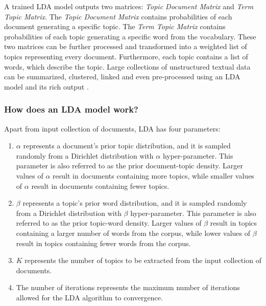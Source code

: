             A trained LDA model outputs two matrices: \emph{Topic Document Matrix} and \emph{Term Topic Matrix}. The \emph{Topic Document Matrix} contains probabilities of each document generating a specific topic. The \emph{Term Topic Matrix} contains probabilities of each topic generating a specific word from the vocabulary. These two matrices can be further processed and transformed into a weighted list of topics representing every document. Furthermore, each topic contains a list of words, which describe the topic. Large collections of unstructured textual data can be summarized, clustered, linked and even pre-processed using an LDA model and its rich output \cite{campbell2015latent}.
        
        \subsubsection{How does an LDA model work?}
        
            Apart from input collection of documents, LDA has four parameters:
            
            \begin{enumerate}
                \item $\alpha$ represents a document's prior topic distribution, and it is sampled randomly from a Dirichlet distribution with $\alpha$ hyper-parameter. This parameter is also referred to as the prior document-topic density. Larger values of $\alpha$ result in documents containing more topics, while smaller values of $\alpha$ result in documents containing fewer topics. 
                
                \item $\beta$ represents a topic's prior word distribution, and it is sampled randomly from a Dirichlet distribution with $\beta$ hyper-parameter. This parameter is also referred to as the prior topic-word density. Larger values of $\beta$ result in topics containing a larger number of words from the corpus, while lower values of $\beta$ result in topics containing fewer words from the corpus.
                
                \item $K$ represents the number of topics to be extracted from the input collection of documents.
                
                \item The number of iterations represents the maximum number of iterations allowed for the LDA algorithm to convergence.
            \end{enumerate}
        
